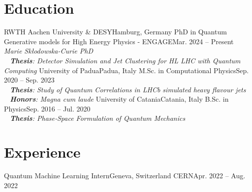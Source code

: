 \documentclass[letterpaper,11pt]{article}
\begin{document}
\section{Education}
  \resumeSubHeadingListStart
    \resumeSubheading
      {RWTH Aachen University \& DESY}{Hamburg, Germany}
      {PhD in Quantum Generative models for High Energy Physics - ENGAGE}{Mar. 2024 -- Present}
      {
        ~\\
        \textit{\small{Marie Sk{\l}odowska-Curie PhD}}\\
        \textit{\quad \small\textbullet~ \textbf{Thesis}: Detector Simulation and Jet Clustering for HL LHC with Quantum Computing}
      }
    \resumeSubheading
      {University of Padua}{Padua, Italy}
      {M.Sc. in Computational Physics}{Sep. 2020 -- Sep. 2023}
      {
        ~\\
        \textit{\quad \small\textbullet~ \textbf{Thesis}: Study of Quantum Correlations in LHCb simulated heavy flavour jets}\\
        \textit{\quad \small\textbullet~ \textbf{Honors}: Magna cum laude}
      }
    \resumeSubheading
      {University of Catania}{Catania, Italy}
      {B.Sc. in Physics}{Sep. 2016 -- Jul. 2020}
      {
        ~\\
        \textit{\quad \small\textbullet~ \textbf{Thesis}: Phase‑Space Formulation of Quantum Mechanics}
      }
  \resumeSubHeadingListEnd


\section{Experience}
  \resumeSubHeadingListStart
    \resumeSubheading
      {Quantum Machine Learning Intern}{Geneva, Switzerland}
      {CERN}{Apr. 2022 -- Aug. 2022}
      \resumeItemListStart
      \resumeItemListEnd

  \resumeSubHeadingListEnd

%
\end{document}
